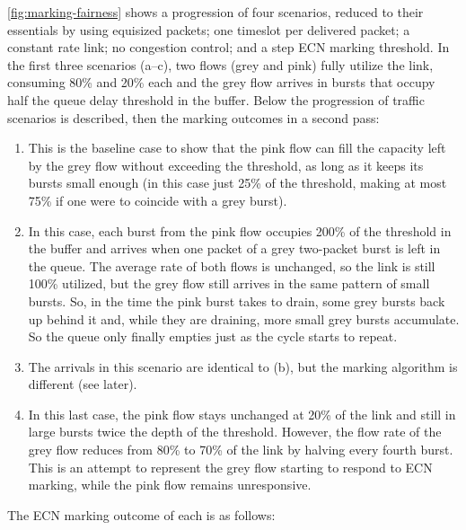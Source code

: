 \autoref{fig:marking-fairness} shows a progression of four scenarios, reduced to their essentials by using equisized packets; one timeslot per delivered packet; a constant rate link; no congestion control; and a step ECN marking threshold. In the first three scenarios (a--c), two flows (grey and pink) fully utilize the link, consuming 80\% and 20\% each and the grey flow arrives in bursts that occupy half the queue delay threshold in the buffer. Below the progression of traffic scenarios is described, then the marking outcomes in a second pass:
\begin{enumerate}[nosep, label=\alph*)]
	\item This is the baseline case to show that the pink flow can fill the capacity left by the grey flow without exceeding the threshold, as long as it keeps its bursts small enough (in this case just 25\% of the threshold, making at most 75\% if one were to coincide with a grey burst). 
	\item In this case, each burst from the pink flow occupies 200\% of the threshold in the buffer and arrives when one packet of a grey two-packet burst is left in the queue. The average rate of both flows is unchanged, so the link is still 100\% utilized, but the grey flow still arrives in the same pattern of small bursts. So, in the time the pink burst takes to drain, some grey bursts back up behind it and, while they are draining, more small grey bursts accumulate. So the queue only finally empties just as the cycle starts to repeat.
	\item The arrivals in this scenario are identical to (b), but the marking algorithm is different (see later).
	\item In this last case, the pink flow stays unchanged at 20\% of the link and still in large bursts twice the depth of the threshold. However, the flow rate of the grey flow reduces from 80\% to 70\% of the link by halving every fourth burst. This is an attempt to represent the grey flow starting to respond to ECN marking, while the pink flow remains unresponsive.
\end{enumerate}
The ECN marking outcome of each is as follows:
